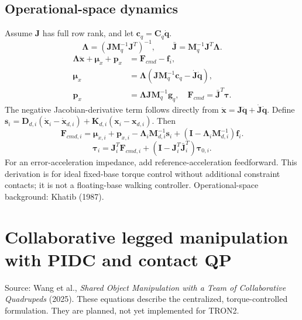 \documentclass[11pt]{article}
\newcommand{\vect}[1]{\bm{#1}}
\begin{document}
\subsection*{Operational-space dynamics}
Assume $\vect J$ has full row rank, and let
$\vect c_q=\vect C_q\dot{\vect q}$.
\begin{equation}
\vect\Lambda=(\vect J\vect M_q^{-1}\vect J^T)^{-1},\qquad
\bar{\vect J}=\vect M_q^{-1}\vect J^T\vect\Lambda.
\tag{DIMP-05}
\end{equation}
\begin{equation}
\begin{split}
\vect\Lambda\ddot{\vect x}+\vect\mu_x+\vect p_x
&=\vect F_{cmd}-\vect f_i,\\
\vect\mu_x&=\vect\Lambda(\vect J\vect M_q^{-1}\vect c_q
-\dot{\vect J}\dot{\vect q}),\\
\vect p_x&=\vect\Lambda\vect J\vect M_q^{-1}\vect g_q,
\quad\vect F_{cmd}=\bar{\vect J}^{T}\vect\tau.
\end{split}\tag{DIMP-06}
\end{equation}
The negative Jacobian-derivative term follows directly from
$\ddot{\vect x}=\vect J\ddot{\vect q}+\dot{\vect J}\dot{\vect q}$.
Define $\vect s_i=\vect D_{d,i}(\dot{\vect x}_i-\dot{\vect x}_{d,i})
+\vect K_{d,i}(\vect x_i-\vect x_{d,i})$. Then
\begin{equation}
\vect F_{cmd,i}=\vect\mu_{x,i}+\vect p_{x,i}
-\vect\Lambda_i\vect M_{d,i}^{-1}\vect s_i
+(\vect I-\vect\Lambda_i\vect M_{d,i}^{-1})\vect f_i.
\tag{DIMP-07}
\end{equation}
\begin{equation}
\vect\tau_i=\vect J_i^T\vect F_{cmd,i}
+(\vect I-\vect J_i^T\bar{\vect J}_i^T)\vect\tau_{0,i}.
\tag{DIMP-08}
\end{equation}
\noindent For an error-acceleration impedance, add reference-acceleration
feedforward. This derivation is for ideal fixed-base torque control without
additional constraint contacts; it is not a floating-base walking controller.
Operational-space background: Khatib (1987).

\clearpage
\section*{Collaborative legged manipulation with PIDC and contact QP}
\noindent Source: Wang et al., \emph{Shared Object Manipulation with a Team
of Collaborative Quadrupeds} (2025). These equations describe the centralized,
torque-controlled formulation. They are planned, not yet implemented for TRON2.
\end{document}

